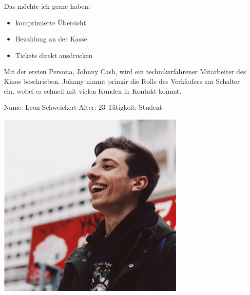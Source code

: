 Das möchte ich gerne haben:
\begin{itemize}
	\item komprimierte Übersicht
	\item Bezahlung an der Kasse
	\item Tickets direkt ausdrucken
\end{itemize}

Mit der ersten Persona, Johnny Cash, wird ein technikerfahrener Mitarbeiter des Kinos beschrieben.
Johnny nimmt primär die Rolle des Verkäufers am Schalter ein, wobei er schnell mit vielen Kunden in Kontakt kommt.

\newpage
{}
\begin{minipage}[t]{0.5\textwidth} 	\vspace{0.2\baselineskip} %
	\begin{entrylist}
		\entry
		{Name:}
		{Leon Schweickert}
		\entry
		{Alter:}
		{23}
		\entry
		{Tätigkeit:}
		{Student}
	\end{entrylist}
	\begin{barchart}{5.0}\hspace{-1mm}
	\end{barchart}
\end{minipage}
\hfil
\begin{minipage}[t]{0.4\textwidth} 	\vspace{0.0\baselineskip} %
	\flushright
	\includegraphics[width=0.70\textwidth]{img/personas/leon}
\end{minipage}

